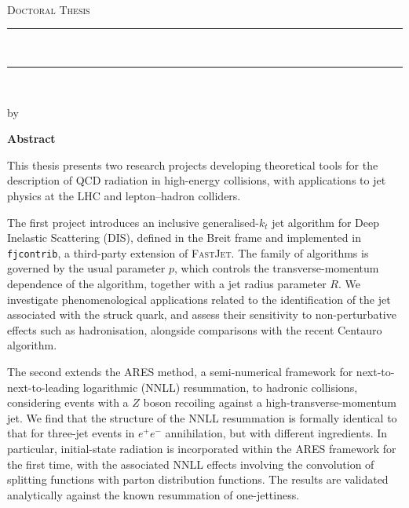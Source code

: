 
\thispagestyle{empty}

\begin{center}

    {\normalsize \href{http://www.sussex.ac.uk/}{\myUni} \\} %
    {\normalsize \myFaculty \\} %
    {\normalsize \myDepartment \\} %
    \bigskip\vspace*{.02\textheight}
    {\Large \textsc{Doctoral Thesis}}\par
    \bigskip
    
    {\rule{\linewidth}{1pt}\\%
    \Large \myTitle \par} %
    \rule{\linewidth}{1pt}\\[0.4cm]
    
    \bigskip
	{\normalsize by \myName \par} %
    \bigskip\vspace*{.01\textheight}
\end{center}

    {\centering\Huge \textbf{Abstract} \par}
    \bigskip

\noindent
This thesis presents two research projects developing theoretical tools for the
description of QCD radiation in high-energy collisions, with applications to
jet physics at the LHC and lepton--hadron colliders.

The first project introduces an inclusive generalised-$k_t$ jet algorithm for
Deep Inelastic Scattering (DIS), defined in the Breit frame and implemented in
\texttt{fjcontrib}, a third-party extension of \textsc{FastJet}. The family of
algorithms is governed by the usual parameter $p$, which controls the
transverse-momentum dependence of the algorithm, together with a jet radius
parameter $R$. We investigate phenomenological applications related to the
identification of the jet associated with the struck quark, and assess their
sensitivity to non-perturbative effects such as hadronisation, alongside
comparisons with the recent Centauro algorithm.

The second extends the \textsc{ARES} method, a semi-numerical framework for
next-to-next-to-leading logarithmic (NNLL) resummation, to hadronic collisions,
considering events with a $Z$ boson recoiling against a high-transverse-momentum
jet. We find that the structure of the NNLL resummation is formally identical to
that for three-jet events in $e^+e^-$ annihilation, but with different
ingredients. In particular, initial-state radiation is incorporated within the
\textsc{ARES} framework for the first time, with the associated NNLL effects
involving the convolution of splitting functions with parton distribution
functions. The results are validated analytically against the known resummation
of one-jettiness.
 
